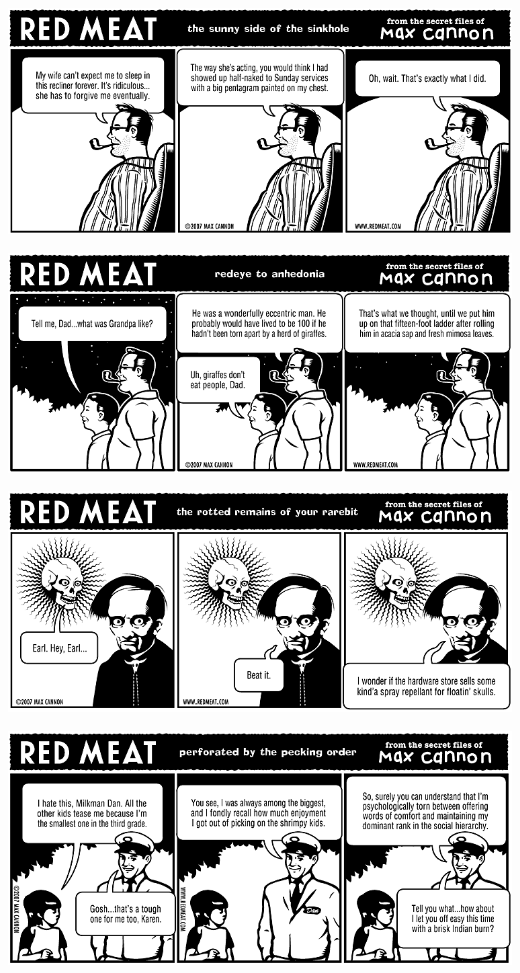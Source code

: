 \documentclass[a4paper,twoside,11pt]{article}
\begin{document}
\includegraphics[width=\textwidth]{redmeat_2007-09-25.png}



\includegraphics[width=\textwidth]{redmeat_2007-10-02.png}



\includegraphics[width=\textwidth]{redmeat_2007-10-09.png}



\includegraphics[width=\textwidth]{redmeat_2007-10-16.png}
\end{document}
